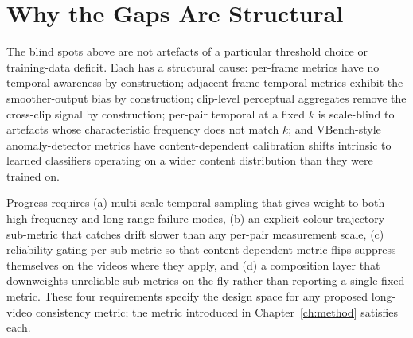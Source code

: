 \section{Why the Gaps Are Structural}
\label{sec:problem:structural}

The blind spots above are not artefacts of a particular threshold choice or training-data
deficit. Each has a structural cause: per-frame metrics have no temporal awareness by
construction; adjacent-frame temporal metrics exhibit the smoother-output bias by
construction; clip-level perceptual aggregates remove the cross-clip signal by
construction; per-pair temporal at a fixed $k$ is scale-blind to artefacts whose
characteristic frequency does not match $k$; and VBench-style anomaly-detector metrics
have content-dependent calibration shifts intrinsic to learned classifiers operating on a
wider content distribution than they were trained on.

Progress requires (a) multi-scale temporal sampling that gives weight to both
high-frequency and long-range failure modes, (b) an explicit colour-trajectory sub-metric
that catches drift slower than any per-pair measurement scale, (c) reliability gating per
sub-metric so that content-dependent metric flips suppress themselves on the videos where
they apply, and (d) a composition layer that downweights unreliable sub-metrics
on-the-fly rather than reporting a single fixed metric. These four requirements specify
the design space for any proposed long-video consistency metric; the metric introduced in
Chapter~\ref{ch:method} satisfies each.
